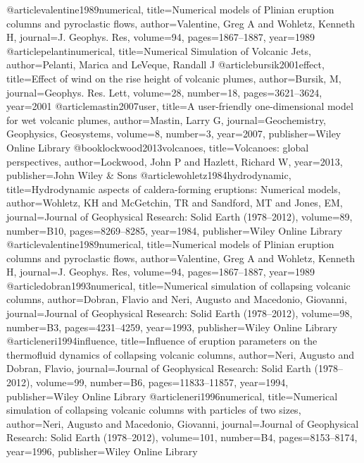 @article{valentine1989numerical,
  title={Numerical models of Plinian eruption columns and pyroclastic flows},
  author={Valentine, Greg A and Wohletz, Kenneth H},
  journal={J. Geophys. Res},
  volume={94},
  pages={1867--1887},
  year={1989}
}
@article{pelantinumerical,
  title={Numerical Simulation of Volcanic Jets},
  author={Pelanti, Marica and LeVeque, Randall J}
}
@article{bursik2001effect,
  title={Effect of wind on the rise height of volcanic plumes},
  author={Bursik, M},
  journal={Geophys. Res. Lett},
  volume={28},
  number={18},
  pages={3621--3624},
  year={2001}
}
@article{mastin2007user,
  title={A user-friendly one-dimensional model for wet volcanic plumes},
  author={Mastin, Larry G},
  journal={Geochemistry, Geophysics, Geosystems},
  volume={8},
  number={3},
  year={2007},
  publisher={Wiley Online Library}
}
@book{lockwood2013volcanoes,
  title={Volcanoes: global perspectives},
  author={Lockwood, John P and Hazlett, Richard W},
  year={2013},
  publisher={John Wiley \& Sons}
}
@article{wohletz1984hydrodynamic,
  title={Hydrodynamic aspects of caldera-forming eruptions: Numerical models},
  author={Wohletz, KH and McGetchin, TR and Sandford, MT and Jones, EM},
  journal={Journal of Geophysical Research: Solid Earth (1978--2012)},
  volume={89},
  number={B10},
  pages={8269--8285},
  year={1984},
  publisher={Wiley Online Library}
}
@article{valentine1989numerical,
  title={Numerical models of Plinian eruption columns and pyroclastic flows},
  author={Valentine, Greg A and Wohletz, Kenneth H},
  journal={J. Geophys. Res},
  volume={94},
  pages={1867--1887},
  year={1989}
}
@article{dobran1993numerical,
  title={Numerical simulation of collapsing volcanic columns},
  author={Dobran, Flavio and Neri, Augusto and Macedonio, Giovanni},
  journal={Journal of Geophysical Research: Solid Earth (1978--2012)},
  volume={98},
  number={B3},
  pages={4231--4259},
  year={1993},
  publisher={Wiley Online Library}
}
@article{neri1994influence,
  title={Influence of eruption parameters on the thermofluid dynamics of collapsing volcanic columns},
  author={Neri, Augusto and Dobran, Flavio},
  journal={Journal of Geophysical Research: Solid Earth (1978--2012)},
  volume={99},
  number={B6},
  pages={11833--11857},
  year={1994},
  publisher={Wiley Online Library}
}
@article{neri1996numerical,
  title={Numerical simulation of collapsing volcanic columns with particles of two sizes},
  author={Neri, Augusto and Macedonio, Giovanni},
  journal={Journal of Geophysical Research: Solid Earth (1978--2012)},
  volume={101},
  number={B4},
  pages={8153--8174},
  year={1996},
  publisher={Wiley Online Library}
}
